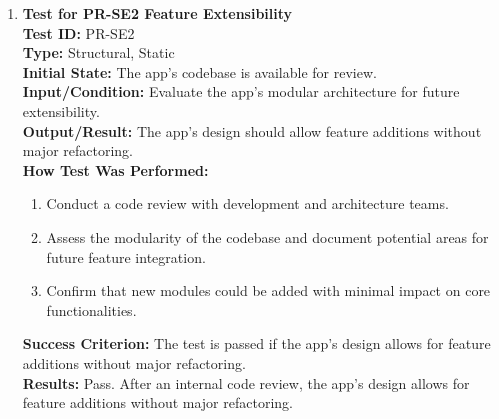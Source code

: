 \documentclass[12pt, titlepage]{article}
\begin{document}
\begin{enumerate}
    \item \textbf{Test for PR-SE2 Feature Extensibility} \\
      \newline
      \textbf{Test ID:} PR-SE2 \\
      \textbf{Type:} Structural, Static \\
      \textbf{Initial State:} The app’s codebase is available for review. \\
      \textbf{Input/Condition:} Evaluate the app’s modular architecture for future extensibility. \\
      \textbf{Output/Result:} The app’s design should allow feature additions without major refactoring. \\
      \textbf{How Test Was Performed:}
      \begin{enumerate}
          \item Conduct a code review with development and architecture teams.
          \item Assess the modularity of the codebase and document potential areas for future feature integration.
          \item Confirm that new modules could be added with minimal impact on core functionalities.
      \end{enumerate}
      \textbf{Success Criterion:} The test is passed if the app’s design allows for feature additions without major refactoring.\\
      \textbf{Results:} Pass. After an internal code review, the app's design allows for feature additions without major refactoring.\\


\end{enumerate}
\end{document}
